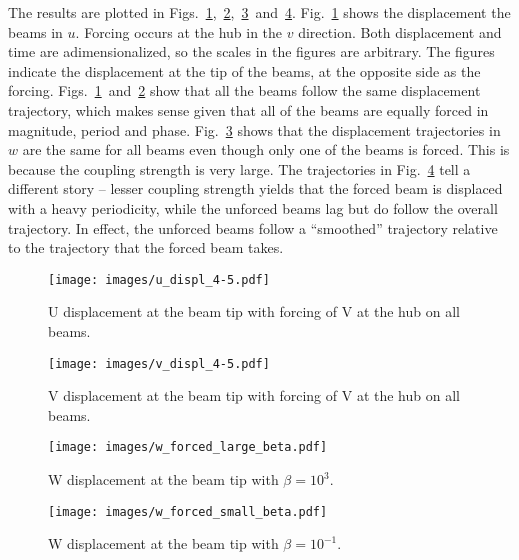 The results are plotted in Figs.~\ref{fig:u_displ},~\ref{fig:v_displ},~\ref{fig:w_displ_beta_large}~and~\ref{fig:w_displ_beta_small}. Fig.~\ref{fig:u_displ} shows the displacement the beams in $u$. Forcing occurs at the hub in the $v$ direction. Both displacement and time are adimensionalized, so the scales in the figures are arbitrary. The figures indicate the displacement at the tip of the beams, at the opposite side as the forcing. Figs.~\ref{fig:u_displ}~and~\ref{fig:v_displ} show that all the beams follow the same displacement trajectory, which makes sense given that all of the beams are equally forced in magnitude, period and phase. Fig.~\ref{fig:w_displ_beta_large} shows that the displacement trajectories in $w$ are the same for all beams even though only one of the beams is forced. This is because the coupling strength is very large. The trajectories in Fig.~\ref{fig:w_displ_beta_small} tell a different story -- lesser coupling strength yields that the forced beam is displaced with a heavy periodicity, while the unforced beams lag but do follow the overall trajectory. In effect, the unforced beams follow a ``smoothed'' trajectory relative to the trajectory that the forced beam takes.

\begin{center}
\begin{figure}[ht!]
\caption{U displacement at the beam tip with forcing of V at the hub on all beams.}
\label{fig:u_displ}
\centering
\texttt{[image: images/u\_displ\_4-5.pdf]}
\end{figure}
\end{center}

\begin{center}
\begin{figure}[ht!]
\caption{V displacement at the beam tip with forcing of V at the hub on all beams.}
\label{fig:v_displ}
\centering
\texttt{[image: images/v\_displ\_4-5.pdf]}
\end{figure}
\end{center}

\begin{center}
\begin{figure}[ht!]
\caption{W displacement at the beam tip with $\beta=10^{3}$.}
\label{fig:w_displ_beta_large}
\centering
\texttt{[image: images/w\_forced\_large\_beta.pdf]}
\end{figure}
\end{center}

\begin{center}
\begin{figure}[ht!]
\caption{W displacement at the beam tip with $\beta=10^{-1}$.}
\label{fig:w_displ_beta_small}
\centering
\texttt{[image: images/w\_forced\_small\_beta.pdf]}
\end{figure}
\end{center}

